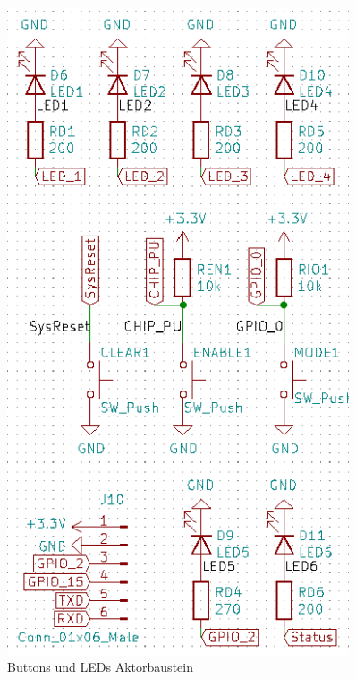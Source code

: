 \begin{figure}[htb]
\begin{minipage}[t]{0.45\linewidth}
	\includegraphics[width=0.9\textwidth]{graphics/shematics_aktor_buttons_LEDs.png}
	\caption{Buttons und LEDs Aktorbaustein}
	\label{pic: Buttons_LEDs_aktor}
	\end{minipage}
\end{figure}

